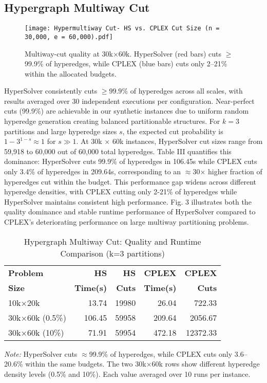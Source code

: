 \documentclass[conference]{IEEEtran}
\begin{document}
\subsection{Hypergraph Multiway Cut}
\begin{figure}
    \centering
    \texttt{[image: Hypermultiway Cut- HS vs. CPLEX Cut Size (n = 30,000, e = 60,000).pdf]}
    \caption{Multiway-cut quality at 30k\(\times\)60k. HyperSolver (red bars) cuts \(\geq\)99.9\% of hyperedges, while CPLEX (blue bars) cuts only 2--21\% within the allocated budgets.}
    \label{fig:multiway-quality}
\end{figure}

HyperSolver consistently cuts \(\geq 99.9\%\) of hyperedges across all scales, with results averaged over 30 independent executions per configuration. Near-perfect cuts (99.9\%) are achievable in our synthetic instances due to uniform random hyperedge generation creating balanced partitionable structures. For \(k=3\) partitions and large hyperedge sizes \(s\), the expected cut probability is \(1-3^{1-s} \approx 1\) for \(s \gg 1\). At 30k \(\times\) 60k instances, HyperSolver cut sizes range from 59,918 to 60,000 out of 60,000 total hyperedges. Table III quantifies this dominance: HyperSolver cuts 99.9\% of hyperedges in 106.45s while CPLEX cuts only 3.4\% of hyperedges in 209.64s, corresponding to an \(\approx\)30\(\times\) higher fraction of hyperedges cut within the budget. This performance gap widens across different hyperedge densities, with CPLEX cutting only 2-21\% of hyperedges while HyperSolver maintains consistent high performance. Fig. 3 illustrates both the quality dominance and stable runtime performance of HyperSolver compared to CPLEX's deteriorating performance on large multiway partitioning problems.

\begin{table}[htbp]
\centering
\caption{Hypergraph Multiway Cut: Quality and Runtime Comparison (k=3 partitions)}
\label{tab:multiway}
\footnotesize
\setlength{\tabcolsep}{5pt}
\begin{tabular}{|l|r|r|r|r|}
\hline
\textbf{Problem} & \textbf{HS} & \textbf{HS} & \textbf{CPLEX} & \textbf{CPLEX} \\
\textbf{Size} & \textbf{Time(s)} & \textbf{Cuts} & \textbf{Time(s)} & \textbf{Cuts} \\
\hline
10k\(\times\)20k & 13.74 & 19980 & 26.04 & 722.33 \\
30k\(\times\)60k (0.5\%) & 106.45 & 59958 & 209.64 & 2056.67 \\
30k\(\times\)60k (10\%) & 71.91 & 59954 & 472.18 & 12372.33 \\
\hline
\end{tabular}
\begin{flushleft}
\vspace{1pt}
\footnotesize
\textit{Note:} HyperSolver cuts \(\approx\)99.9\% of hyperedges, while CPLEX cuts only 3.6--20.6\% within the same budgets. The two 30k\(\times\)60k rows show different hyperedge density levels (0.5\% and 10\%). Each value averaged over 10 runs per instance.
\end{flushleft}
\end{table}
\end{document}
